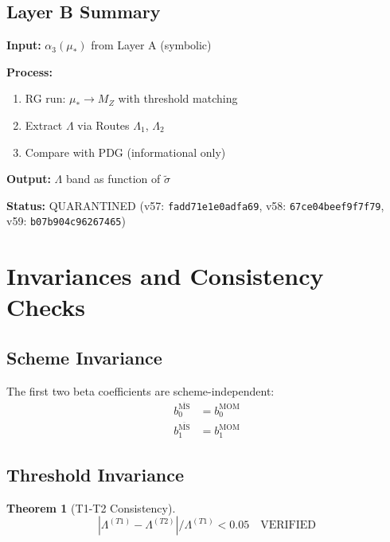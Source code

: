 \documentclass[11pt,a4paper]{article}
\theoremstyle{definition}
\newtheorem{theorem}{Theorem}[section]
\begin{document}
\subsection{Layer B Summary}
\label{subsec:layer-b-summary}

\begin{layerbbox}
\textbf{Input:} $\alpha_3(\mu_*)$ from Layer A (symbolic)

\textbf{Process:}
\begin{enumerate}
  \item RG run: $\mu_* \to M_Z$ with threshold matching
  \item Extract $\Lambda$ via Routes $\Lambda_1$, $\Lambda_2$
  \item Compare with PDG (informational only)
\end{enumerate}

\textbf{Output:} $\Lambda$ band as function of $\tilde{\sigma}$

\textbf{Status:} QUARANTINED (v57: \texttt{fadd71e1e0adfa69}, v58: \texttt{67ce04beef9f7f79}, v59: \texttt{b07b904c96267465})
\end{layerbbox}

\section{Invariances and Consistency Checks}
\label{sec:invariances}

\subsection{Scheme Invariance}
\label{subsec:scheme-inv}

The first two beta coefficients are scheme-independent:
\begin{align}
\label{eq:b0-scheme}
b_0^{\overline{\text{MS}}} &= b_0^{\text{MOM}} \\
\label{eq:b1-scheme}
b_1^{\overline{\text{MS}}} &= b_1^{\text{MOM}}
\end{align}

\subsection{Threshold Invariance}
\label{subsec:threshold-inv}

\begin{theorem}[T1-T2 Consistency]
\label{thm:t1-t2-canon}
\begin{equation}
\label{eq:t1-t2-bound-canon}
|\Lambda^{(T1)} - \Lambda^{(T2)}| / \Lambda^{(T1)} < 0.05 \quad \text{VERIFIED}
\end{equation}
\end{theorem}
\end{document}
